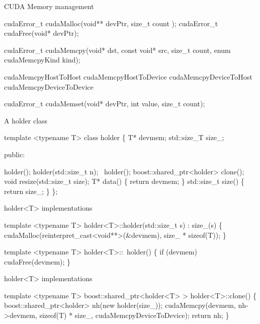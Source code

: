 \documentclass[9pt]{beamer}
\begin{document}

\begin{frame}[fragile]{CUDA Memory management}
  \begin{semiverbatim}
cudaError_t cudaMalloc(void** devPtr, size_t count );
cudaError_t cudaFree(void* devPtr);

cudaError_t cudaMemcpy(void* dst, const void* src, 
                       size_t count, 
                       enum cudaMemcpyKind kind);

cudaMemcpyHostToHost
cudaMemcpyHostToDevice
cudaMemcpyDeviceToHost
cudaMemcpyDeviceToDevice

cudaError_t cudaMemset(void* devPtr, int value, 
                       size_t count);
  \end{semiverbatim}
\end{frame}


\begin{frame}[fragile]{A holder class}
  \begin{semiverbatim}template <typename T>
class holder
\{
    T* devmem;
    std::size_T size_;

  public:

    holder();
    holder(std::size_t n);
    ~holder();
    boost::shared_ptr<holder> clone();
    void resize(std::size_t size);
    T* data() \{ return devmem; \}
    std::size_t size() \{ return size_; \}
\};
\end{semiverbatim}
\end{frame}

\begin{frame}[fragile]{holder<T> implementations}
\begin{semiverbatim}template <typename T>
holder<T>::holder(std::size_t s) : size_(s)
\{
   cudaMalloc(reinterpret_cast<void**>(&devmem), 
              size_ * sizeof(T));
\}

template <typename T>
holder<T>::~holder()
\{
  if (devmem)
    cudaFree(devmem);
\}
  \end{semiverbatim}
\end{frame}

\begin{frame}[fragile]{holder<T> implementations}
\begin{semiverbatim}template <typename T>
boost::shared_ptr<holder<T> >
holder<T>::clone()
\{
   boost::shared_ptr<holder> nh(new holder(size_));
   cudaMemcpy(devmem, nh->devmem,
              sizeof(T) * size_,
              cudaMemcpyDeviceToDevice);       
   return nh;
\}
  \end{semiverbatim}
\end{frame}
\end{document}
